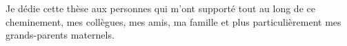 \begin{dedic}

Je dédie cette thèse aux personnes qui m'ont supporté tout au long de ce cheminement, mes collègues, mes amis, ma famille et plus particulièrement mes grands-parents maternels.

\end{dedic}
